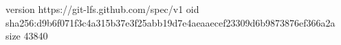 version https://git-lfs.github.com/spec/v1
oid sha256:d9b6f071f3c4a315b37e3f25abb19d7e4aeaaecef23309d6b9873876ef366a2a
size 43840
